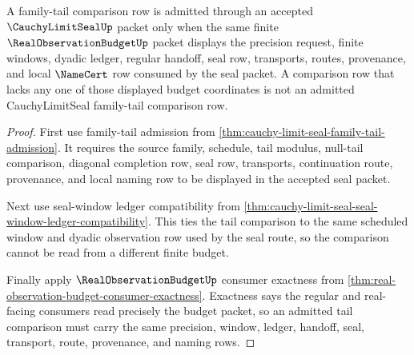 \begin{theorem}
\label{thm:cauchy-limit-seal-budgeted-tail-comparison-admission}
A family-tail comparison row is admitted through an accepted $\CauchyLimitSealUp$ packet only when the same finite $\RealObservationBudgetUp$ packet displays the precision request, finite windows, dyadic ledger, regular handoff, seal row, transports, routes, provenance, and local $\NameCert$ row consumed by the seal packet. A comparison row that lacks any one of those displayed budget coordinates is not an admitted CauchyLimitSeal family-tail comparison row.
\end{theorem}
\begin{proof}
First use family-tail admission from \autoref{thm:cauchy-limit-seal-family-tail-admission}. It requires the source family, schedule, tail modulus, null-tail comparison, diagonal completion row, seal row, transports, continuation route, provenance, and local naming row to be displayed in the accepted seal packet.

Next use seal-window ledger compatibility from \autoref{thm:cauchy-limit-seal-seal-window-ledger-compatibility}. This ties the tail comparison to the same scheduled window and dyadic observation row used by the seal route, so the comparison cannot be read from a different finite budget.

Finally apply $\RealObservationBudgetUp$ consumer exactness from \autoref{thm:real-observation-budget-consumer-exactness}. Exactness says the regular and real-facing consumers read precisely the budget packet, so an admitted tail comparison must carry the same precision, window, ledger, handoff, seal, transport, route, provenance, and naming rows.
\end{proof}

